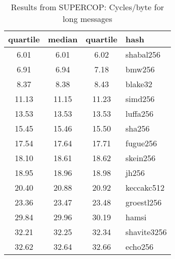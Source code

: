\begin{table}
  \centering
  \begin{tabular}{ | c | c | c | l | }
    \hline
    \textbf{quartile} & \textbf{median} & \textbf{quartile} & \textbf{hash} \\ \hline
    6.01 & 6.01 & 6.02 & shabal256 \\ \hline
    6.91 & 6.94 & 7.18 & bmw256 \\ \hline
    8.37 & 8.38 & 8.43 & blake32 \\ \hline
    11.13 & 11.15 & 11.23 & simd256 \\ \hline
    13.53 & 13.53 & 13.53 & luffa256 \\ \hline
    15.45 & 15.46 & 15.50 & sha256 \\ \hline
    17.54 & 17.64 & 17.71 & fugue256 \\ \hline
    18.10 & 18.61 & 18.62 & skein256 \\ \hline
    18.95 & 18.96 & 18.98 & jh256 \\ \hline
    20.40 & 20.88 & 20.92 & keccakc512 \\ \hline
    23.36 & 23.47 & 23.48 & groestl256 \\ \hline
    29.84 & 29.96 & 30.19 & hamsi \\ \hline
    32.21 & 32.25 & 32.34 & shavite3256 \\ \hline
    32.62 & 32.64 & 32.66 & echo256 \\ \hline
  \end{tabular}
  \caption{Results from SUPERCOP: Cycles/byte for long messages}
  \label{tbl:supercop:long}
\end{table}
